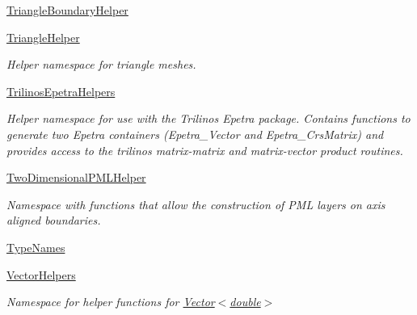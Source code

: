 \begin{DoxyCompactItemize}
 \hyperlink{namespaceoomph_1_1TriangleBoundaryHelper}{Triangle\+Boundary\+Helper}
\item 
 \hyperlink{namespaceoomph_1_1TriangleHelper}{Triangle\+Helper}
\begin{DoxyCompactList}\small\item\em Helper namespace for triangle meshes. \end{DoxyCompactList}\item 
 \hyperlink{namespaceoomph_1_1TrilinosEpetraHelpers}{Trilinos\+Epetra\+Helpers}
\begin{DoxyCompactList}\small\item\em Helper namespace for use with the Trilinos Epetra package. Contains functions to generate two Epetra containers (Epetra\+\_\+\+Vector and Epetra\+\_\+\+Crs\+Matrix) and provides access to the trilinos matrix-\/matrix and matrix-\/vector product routines. \end{DoxyCompactList}\item 
 \hyperlink{namespaceoomph_1_1TwoDimensionalPMLHelper}{Two\+Dimensional\+P\+M\+L\+Helper}
\begin{DoxyCompactList}\small\item\em Namespace with functions that allow the construction of P\+ML layers on axis aligned boundaries. \end{DoxyCompactList}\item 
 \hyperlink{namespaceoomph_1_1TypeNames}{Type\+Names}
\item 
 \hyperlink{namespaceoomph_1_1VectorHelpers}{Vector\+Helpers}
\begin{DoxyCompactList}\small\item\em Namespace for helper functions for \hyperlink{classoomph_1_1Vector}{Vector$<$double$>$} \end{DoxyCompactList}\end{DoxyCompactItemize}
